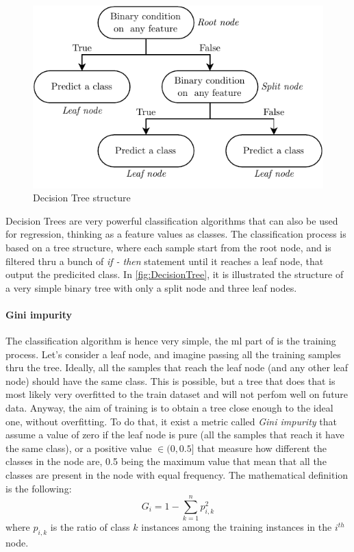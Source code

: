 \begin{figure}
    \centering
    \includegraphics[scale = 1]{images/MachineLearning/DT_structure.pdf}
    \caption{Decision Tree structure}
    \label{fig:DecisionTree}
\end{figure}

Decision Trees are very powerful classification algorithms that can also be used for regression, thinking as a feature values as classes. The classification process is based on a tree structure, where each sample start from the root node, and is filtered thru a bunch of \emph{if - then} statement until it reaches a leaf node, that output the predicited class. In \autoref{fig:DecisionTree}, it is illustrated the structure of a very simple binary tree with only a split node and three leaf nodes.

\paragraph*{Gini impurity}
The classification algorithm is hence very simple, the \gls{ml} part of is the training process. Let's consider a leaf node, and imagine passing all the training samples thru the tree. Ideally, all the samples that reach the leaf node (and any other leaf node) should have the same class. This is possible, but a tree that does that is most likely very overfitted to the train dataset and will not perfom well on future data. Anyway, the aim of training is to obtain a tree close enough to the ideal one, without overfitting. To do that, it exist a metric called \emph{Gini impurity} that assume a value of zero if the leaf node is pure (all the samples that reach it have the same class), or a positive value $\in (0,0.5]$ that measure how different the classes in the node are, 0.5 being the maximum value that mean that all the classes are present in the node with equal frequency. The mathematical definition is the following:
\begin{equation}
    G_i = 1 - \sum_{k=1}^{n}p_{i,k}^2
\end{equation}
where $p_{i,k}$ is the ratio of class $k$ instances among the training instances in the $i^{th}$ node.

